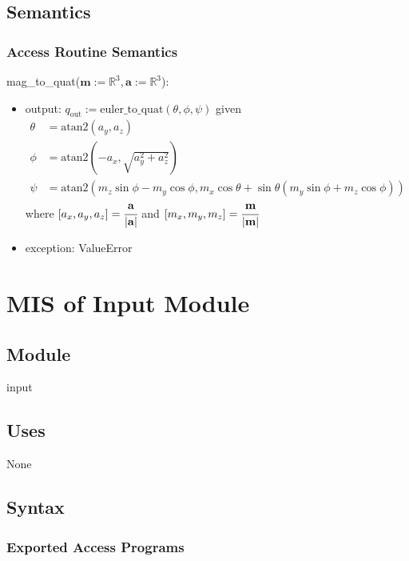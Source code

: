 \documentclass[12pt, titlepage]{article}
\begin{document}
\subsection{Semantics}

\subsubsection{Access Routine Semantics}

\noindent mag\_to\_quat($\mathbf{m}:=\mathbb{R}^3, \mathbf{a}:=\mathbb{R}^3$):
\begin{itemize}
\item output: $q_\text{out}:= \text{euler\_to\_quat}(\theta, \phi, \psi)$ given
\begin{align*}
  \theta &= \text{atan2}(a_y, a_z) \\
  \phi &= \text{atan2}(-a_x, \sqrt{a_y^2+a_z^2}) \\
  \psi &= \text{atan2}(m_z\sin\phi - m_y\cos\phi, m_x\cos\theta + \sin\theta(m_y\sin\phi + m_z\cos\phi))
\end{align*}
where $[a_x, a_y, a_z] = \cfrac{\mathbf{a}}{|\mathbf{a}|}$ and $[m_x, m_y, m_z] = \cfrac{\mathbf{m}}{|\mathbf{m}|}$
\item exception: ValueError
\end{itemize}

\newpage

\section{MIS of Input Module} \label{ivm}

\subsection{Module}
input

\subsection{Uses}
None

\subsection{Syntax}

\subsubsection{Exported Access Programs}
\end{document}

